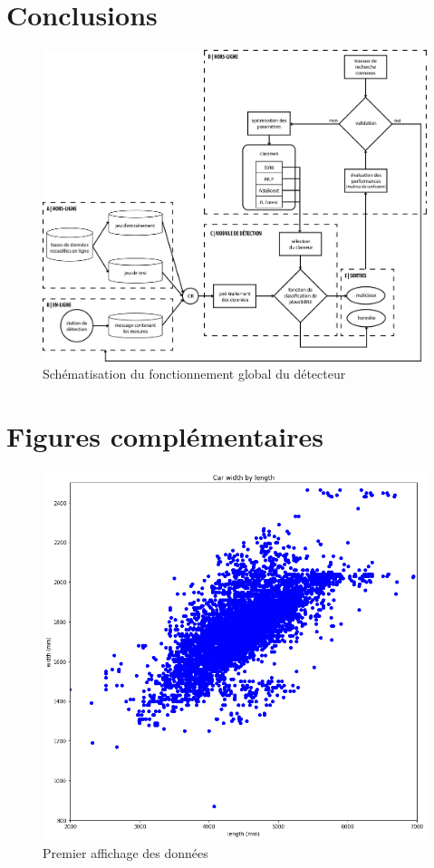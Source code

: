 \documentclass[a4paper]{report}
\begin{document}
\chapter{Conclusions}

\begin{figure}
\centering
\includegraphics[width=\textwidth]{img/structure.png}
\caption{Schématisation du fonctionnement global du détecteur}
\end{figure}






\listoffigures
\begingroup
\let\clearpage\relax
\listoftables
\endgroup

\appendix

\chapter{Figures complémentaires}

\begin{figure}
\centering
\includegraphics[width=\textwidth]{img/first_plot.png}
\caption{Premier affichage des données\label{first_plot}}
\end{figure}
\end{document}
